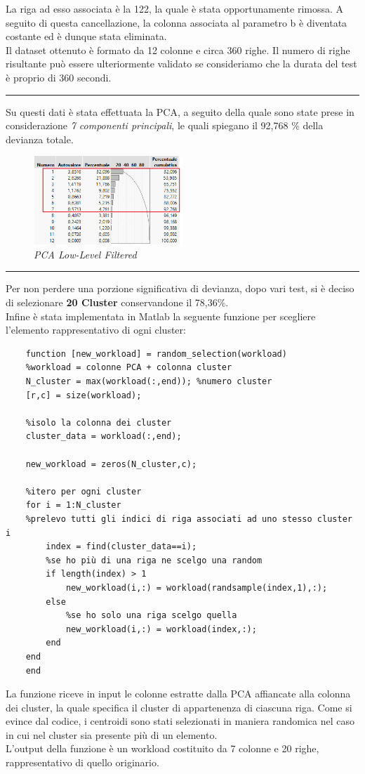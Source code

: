 La riga ad esso associata è la 122, la quale è stata opportunamente rimossa. A seguito di questa cancellazione, la colonna associata al parametro b è diventata costante ed è dunque stata eliminata.
\\
Il dataset ottenuto è formato da 12 colonne e circa 360 righe. Il numero di righe risultante può essere ulteriormente validato se consideriamo che la durata del test è proprio di 360 secondi.
\vspace{0.3cm}
\hrule
\vspace{0.3cm}
Su questi dati è stata effettuata la PCA, a seguito della quale sono state prese in considerazione \textit{7 componenti principali}, le quali spiegano il 92,768 \% della devianza totale.
\begin{figure}[H]
	\centering
	\includegraphics[width=0.5\textwidth]{img/hw3/PCA7.png}
	\caption{\textit{PCA Low-Level Filtered}}
\end{figure}
\hrule
\vspace{0.3cm}
Per non perdere una porzione significativa di devianza, dopo vari test, si è deciso di selezionare \textbf{20 Cluster} conservandone il 78,36\%.
\\
Infine è stata implementata in Matlab la seguente funzione per scegliere l'elemento rappresentativo di ogni cluster:
\begin{verbatim}
	function [new_workload] = random_selection(workload)
	%workload = colonne PCA + colonna cluster
	N_cluster = max(workload(:,end)); %numero cluster
	[r,c] = size(workload);
	
	%isolo la colonna dei cluster
	cluster_data = workload(:,end);
	
	new_workload = zeros(N_cluster,c);
	
	%itero per ogni cluster
	for i = 1:N_cluster
	%prelevo tutti gli indici di riga associati ad uno stesso cluster i
		index = find(cluster_data==i); 
		%se ho più di una riga ne scelgo una random
		if length(index) > 1
			new_workload(i,:) = workload(randsample(index,1),:); 
		else
			%se ho solo una riga scelgo quella
			new_workload(i,:) = workload(index,:);
		end
	end
	end
\end{verbatim}
La funzione riceve in input le colonne estratte dalla PCA affiancate alla colonna dei cluster, la quale specifica il cluster di appartenenza di ciascuna riga.
Come si evince dal codice, i centroidi sono stati selezionati in maniera randomica nel caso in cui nel cluster sia presente più di un elemento.
\\
L'output della funzione è un workload costituito da 7 colonne e 20 righe, rappresentativo di quello originario.

